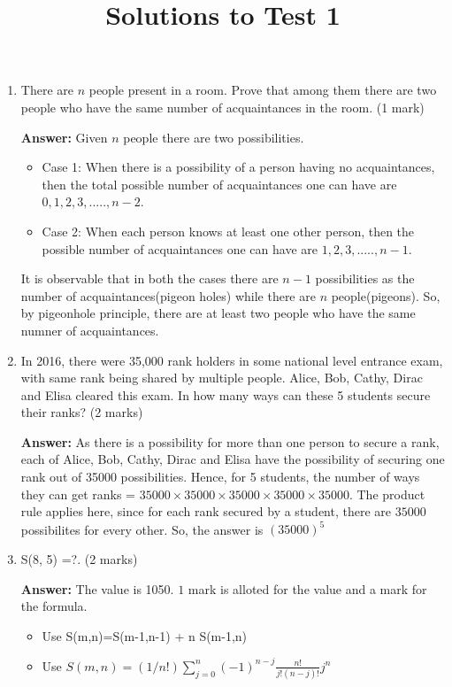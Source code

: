 \documentclass[a4paper]{article}
\title{Solutions to Test 1}
\author{}
\begin{document}
\maketitle



\begin{enumerate}
\item There  are $n$ people present in a room.  Prove  that among them  there  are two people who have the  same number  of acquaintances in the  room.  (1 mark) 

\textbf{Answer:}
Given $n$ people there are two possibilities. 
\begin{itemize}
\item Case 1: When there is a possibility of a person having no acquaintances, then the total possible number of acquaintances one can have are $0,1,2,3,.....,n-2$.
 \item Case 2: When each person knows at least one other person, then the possible number of acquaintances one can have are $1,2,3,.....,n-1$.
 \end{itemize}
It is observable that in both the cases there are $n-1$ possibilities as the number of acquaintances(pigeon holes) while there are $n$ people(pigeons).
So, by pigeonhole principle, there are at least two people who have the same numner of acquaintances.
  
\item In 2016, there  were 35,000 rank  holders  in some national level entrance exam, with same rank being shared by multiple  people.  Alice, Bob, Cathy, Dirac and Elisa cleared this exam.  In how many ways can these 5 students secure their  ranks?  (2 marks)

\textbf{Answer:}
As there is a possibility for more than one person to secure a rank, each of Alice, Bob, Cathy, Dirac and Elisa have the possibility of securing one rank out of 35000 possibilities. Hence, for 5 students, the number of ways they can get ranks = $35000 \times 35000 \times 35000 \times 35000 \times 35000$. The product rule applies here, since for each rank secured by a student, there are $35000$ possibilites for every other.
So, the answer is 
\begin{math} 
 (35000)^5
\end{math}
\item S(8, 5) =?.  (2 marks)

\textbf{Answer:}
The value is 1050. $1$ mark is alloted for the value and a mark for the formula.
\begin{itemize}
\item Use S(m,n)=S(m-1,n-1) + n S(m-1,n)
\item Use
\begin{math} 
 S(m,n)=(1/n!)\sum_{j=0}^{n} (-1)^{n-j}\frac{n!}{j!(n-j)!}j^{n}
\end{math}
\end{itemize}


\end{enumerate}
\end{document}
